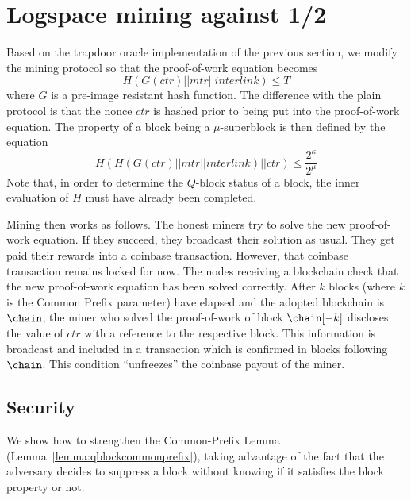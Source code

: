 \section{Logspace mining against 1/2}\label{sec.mining12}

Based on the trapdoor oracle implementation of the previous section,
we modify the mining protocol so that the proof-of-work equation becomes
\[H(G(ctr) || mtr || interlink) \leq T\]
where $G$ is a pre-image resistant hash
function. The difference with the plain protocol is that the nonce $ctr$ is
hashed prior to being put into the proof-of-work equation. The property of a
block being a $\mu$-superblock is then defined by the equation
\[H(H(G(ctr) || mtr || interlink) || ctr) \leq \frac{2^\kappa}{2^\mu}\]
Note
that, in order to determine the $Q$-block status of a block, the inner
evaluation of $H$ must have already been completed.

Mining then works as follows. The honest miners try to solve the new
proof-of-work equation. If they succeed, they broadcast their solution as usual.
They get paid their rewards into a coinbase transaction. However, that coinbase
transaction remains locked for now. The nodes receiving a blockchain check that
the new proof-of-work equation has been solved correctly. After $k$ blocks
(where $k$ is the Common Prefix parameter) have elapsed and the adopted
blockchain is $\chain$, the miner who solved the proof-of-work of block
$\chain[-k]$ discloses the value of $ctr$ with a reference to the respective
block. This information is broadcast and included in a transaction which is
confirmed in blocks following $\chain$. This condition ``unfreezes'' the
coinbase payout of the miner.

\subsection{Security}

We show how to strengthen the Common-Prefix Lemma
(Lemma~\ref{lemma:qblockcommonprefix}), taking advantage of the fact
that the adversary decides to suppress a block without knowing if it
satisfies the block property or not.

